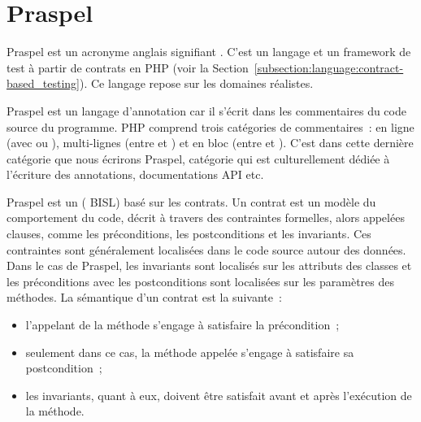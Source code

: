 \def\gsep{$\quad::=\quad$}
\def\mvert{$\;\;|\;\;$}
\newcommand{\token}[1]{\underline{\code{php-#1}}}
\newcommand{\grule}[1]{\textit{#1}}

\section{Praspel}
\label{section:language:praspel}

Praspel est un acronyme anglais signifiant . C'est un langage et un framework de test à partir
de contrats en PHP (voir la
Section~\ref{subsection:language:contract-based_testing}). Ce langage repose sur
les domaines réalistes.

Praspel est un {\strong langage d'annotation} car il s'écrit dans les
commentaires du code source du programme. PHP comprend trois catégories de
commentaires~: en ligne (avec \code{//} ou \code{\#}), multi-lignes (entre
\code{/*} et \code{*/}) et en bloc (entre \code{/**} et \code{*/}). C'est dans
cette dernière catégorie que nous écrirons Praspel, catégorie qui est
culturellement dédiée à l'écriture des annotations, documentations API etc.

Praspel est un  ({\strong
BISL}) basé sur les contrats. Un {\strong contrat} est un modèle du comportement
du code, décrit à travers des contraintes formelles, alors appelées {\strong
clauses}, comme les préconditions, les postconditions et les invariants. Ces
contraintes sont généralement localisées dans le code source autour des données.
Dans le cas de Praspel, les invariants sont localisés sur les attributs des
classes et les préconditions avec les postconditions sont localisées sur les
paramètres des méthodes. La sémantique d'un contrat est la suivante~:

\begin{itemize}

\item l'appelant de la méthode s'engage à satisfaire la précondition~;

\item seulement dans ce cas, la méthode appelée s'engage à satisfaire sa
postcondition~;

\item les invariants, quant à eux, doivent être satisfait avant et après
l'exécution de la méthode.

\end{itemize}


